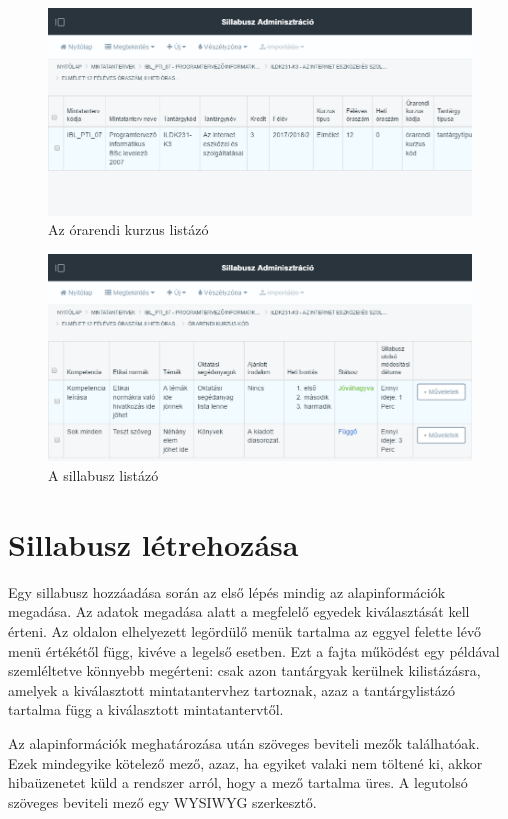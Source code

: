\documentclass[hidelinks, 12pt, a4paper]{report}
\begin{document}
\begin{figure}[H]
    \centering
	\includegraphics[width=\textwidth]{sm_timetable_course_list.png}
	\caption{Az órarendi kurzus listázó}
\end{figure}

\begin{figure}[H]
    \centering
	\includegraphics[width=\textwidth]{sm_syllabus_list.png}
	\caption{A sillabusz listázó}
\end{figure}

\section{Sillabusz létrehozása}

Egy sillabusz hozzáadása során az első lépés mindig az alapinformációk megadása. Az adatok megadása alatt a megfelelő egyedek kiválasztását kell érteni. Az oldalon elhelyezett legördülő menük tartalma az eggyel felette lévő menü értékétől függ, kivéve a legelső esetben. Ezt a fajta működést egy példával szemléltetve könnyebb megérteni: csak azon tantárgyak kerülnek kilistázásra, amelyek a kiválasztott mintatantervhez tartoznak, azaz a tantárgylistázó tartalma függ a kiválasztott mintatantervtől.

Az alapinformációk meghatározása után szöveges beviteli mezők találhatóak. Ezek mindegyike kötelező mező, azaz, ha egyiket valaki nem töltené ki, akkor hibaüzenetet küld a rendszer arról, hogy a mező tartalma üres. A legutolsó szöveges beviteli mező egy WYSIWYG szerkesztő.
\end{document}

